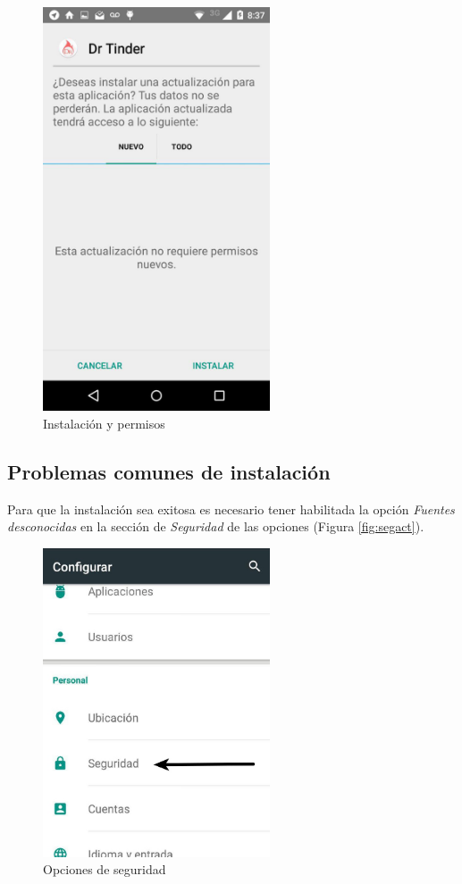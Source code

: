 \documentclass[10pt,letterpaper,extrafontsizes]{memoir}
\begin{document}
\begin{figure}[H]
    \centering
\includegraphics[width=0.6\textwidth]{graficos/capturas/b}
    \caption{Instalación y permisos}
    \label{fig:downloadacpt}
\end{figure}



\subsection{Problemas comunes de instalación}

Para que la instalación sea exitosa es necesario tener habilitada la opción \textit{Fuentes desconocidas} en la sección de \emph{Seguridad} de las opciones (Figura \ref{fig:segact}).

\begin{figure}[H]
    \centering
\includegraphics[width=0.6\textwidth]{graficos/capturas/f}
    \caption{Opciones de seguridad}
    \label{fig:seg}
\end{figure}
\end{document}

